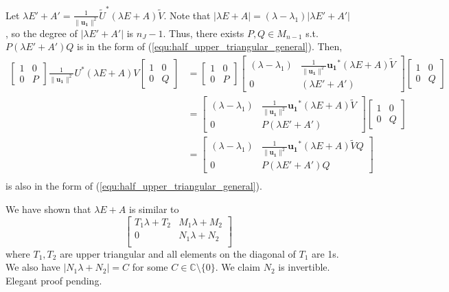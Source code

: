 \documentclass{article}
\newcommand{\0}{\mathbf{0}}
\newcommand{\C}{\mathbb{C}}
\renewcommand{\vec}{\mathbf}
\begin{document}
Let $\lambda E'+A' = \frac{1}{\lVert\vec{u_1}\rVert^2}\tilde{U}^*(\lambda E+A)\tilde{V}$.
Note that $|\lambda E+A|=(\lambda-\lambda_1)|\lambda E'+A'|$, so the degree of $|\lambda E'+A'|$ is $n_J-1$.
Thus, there exists $P,Q \in M_{n-1}$ s.t. $P(\lambda E'+A')Q$ is in the form of (\ref{equ:half_upper_triangular_general}).
Then,
\begin{align*}
    \begin{bmatrix}1&0\\0&P\end{bmatrix}\frac{1}{\lVert\vec{u_1}\rVert^2}U^*(\lambda E + A)V\begin{bmatrix}1&0\\0&Q\end{bmatrix}
    &=\begin{bmatrix}1&0\\0&P\end{bmatrix}\begin{bmatrix}(\lambda-\lambda_1)&\frac{1}{\lVert\vec{u_1}\rVert^2}\vec{u_1}^*(\lambda E+A)\tilde{V}\\0&(\lambda E'+A')\end{bmatrix}\begin{bmatrix}1&0\\0&Q\end{bmatrix}\\
    &=\begin{bmatrix}(\lambda-\lambda_1)&\frac{1}{\lVert\vec{u_1}\rVert^2}\vec{u_1}^*(\lambda E+A)\tilde{V}\\0&P(\lambda E'+A')\end{bmatrix}\begin{bmatrix}1&0\\0&Q\end{bmatrix}\\
    &=\begin{bmatrix}(\lambda-\lambda_1)&\frac{1}{\lVert\vec{u_1}\rVert^2}\vec{u_1}^*(\lambda E+A)\tilde{V}Q\\0&P(\lambda E'+A')Q\end{bmatrix}\\
\end{align*}
is also in the form of (\ref{equ:half_upper_triangular_general}).

We have shown that $\lambda E + A$ is similar to
\begin{equation}
    \label{equ:half_upper_triangular}
    \begin{bmatrix}
        T_1\lambda+T_2&M_1\lambda+M_2\\
        0&N_1\lambda+N_2\\
    \end{bmatrix}
\end{equation}
where $T_1, T_2$ are upper triangular and all elements on the diagonal of $T_1$ are 1s.
We also have $|N_1\lambda+N_2|=C$ for some $C\in\C\setminus\{0\}$.
We claim $N_2$ is invertible. Elegant proof pending.
\end{document}
